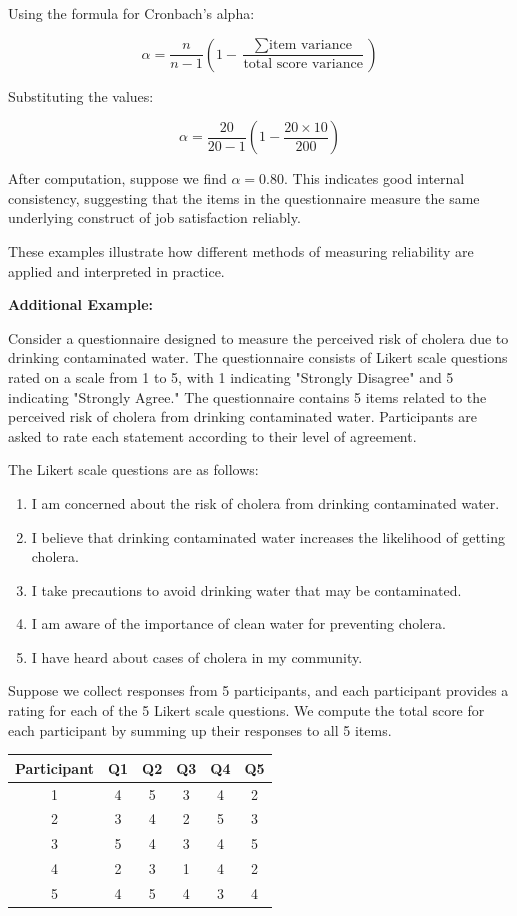 \documentclass[12pt, a4paper]{exam}
\begin{document}
Using the formula for Cronbach's alpha:

\[
\alpha = \frac{n}{n-1} \left(1 - \frac{\sum \text{item variance}}{\text{total score variance}}\right)
\]

Substituting the values:

\[
\alpha = \frac{20}{20-1} \left(1 - \frac{20 \times 10}{200}\right)
\]

After computation, suppose we find \(\alpha = 0.80\). This indicates good internal consistency, suggesting that the items in the questionnaire measure the same underlying construct of job satisfaction reliably.

These examples illustrate how different methods of measuring reliability are applied and interpreted in practice.


\textbf{Additional Example:}



Consider a questionnaire designed to measure the perceived risk of cholera due to drinking contaminated water. The questionnaire consists of Likert scale questions rated on a scale from 1 to 5, with 1 indicating "Strongly Disagree" and 5 indicating "Strongly Agree." The questionnaire contains 5 items related to the perceived risk of cholera from drinking contaminated water. Participants are asked to rate each statement according to their level of agreement.

The Likert scale questions are as follows:

\begin{enumerate}
    \item I am concerned about the risk of cholera from drinking contaminated water.
    \item I believe that drinking contaminated water increases the likelihood of getting cholera.
    \item I take precautions to avoid drinking water that may be contaminated.
    \item I am aware of the importance of clean water for preventing cholera.
    \item I have heard about cases of cholera in my community.
\end{enumerate}

Suppose we collect responses from 5 participants, and each participant provides a rating for each of the 5 Likert scale questions. We compute the total score for each participant by summing up their responses to all 5 items.

\begin{table}[htbp]
\centering
\begin{tabular}{@{}cccccc@{}}
\toprule
Participant & Q1 & Q2 & Q3 & Q4 & Q5 \\ \midrule
1           & 4  & 5  & 3  & 4  & 2  \\
2           & 3  & 4  & 2  & 5  & 3  \\
3           & 5  & 4  & 3  & 4  & 5  \\
4           & 2  & 3  & 1  & 4  & 2  \\
5           & 4  & 5  & 4  & 3  & 4  \\ \bottomrule
\end{tabular}
\end{table}
\end{document}
